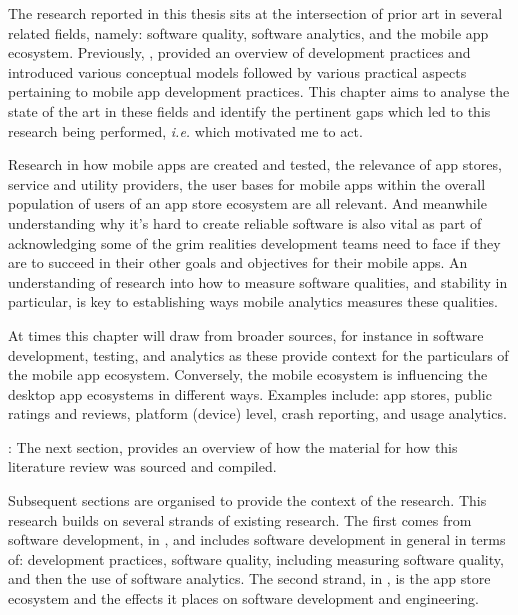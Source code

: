 The research reported in this thesis sits at the intersection of prior art in several related fields, namely: software quality, software analytics, and the mobile app ecosystem. %
Previously, , provided an overview of development practices and introduced various conceptual models followed by various practical aspects pertaining to mobile app development practices.  
This chapter aims to analyse the state of the art in these fields and identify the pertinent gaps which led to this research being performed, \emph{i.e.} which motivated me to act.  

Research in how mobile apps are created and tested, the relevance of app stores, service and utility providers, the user bases for mobile apps within the overall population of users of an app store ecosystem are all relevant. And meanwhile understanding why it's hard to create reliable software is also vital as part of acknowledging some of the grim realities development teams need to face if they are to succeed in their other goals and objectives for their mobile apps. An understanding of research into how to measure software qualities, and stability in particular, is key to establishing ways mobile analytics measures these qualities. 

At times this chapter will draw from broader sources, 
for instance in software development, testing, and analytics as these provide context for the particulars of the mobile app ecosystem. Conversely, the mobile ecosystem is influencing the desktop app ecosystems in different ways.  
Examples include: app stores, %
public ratings and reviews, platform (device) level, crash reporting, and usage analytics.

: 
The next section,  provides an overview of how the material for how this literature review was sourced and compiled.

Subsequent sections are organised to provide the context of the research. This research builds on several strands of existing research. The first comes from software development, in , and includes software development in general in terms of: development practices, software quality, including measuring software quality, and then the use of software analytics. The second strand, in , is the app store ecosystem and the effects it places on software development and engineering.

